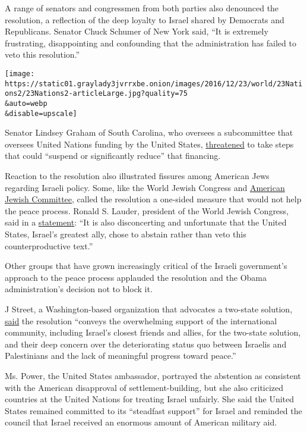 A range of senators and congressmen from both parties also denounced the
resolution, a reflection of the deep loyalty to Israel shared by
Democrats and Republicans. Senator Chuck Schumer of New York said, ``It
is extremely frustrating, disappointing and confounding that the
administration has failed to veto this resolution.''

\texttt{[image: https://static01.graylady3jvrrxbe.onion/images/2016/12/23/world/23Nations2/23Nations2-articleLarge.jpg?quality=75\\\&auto=webp\\\&disable=upscale]}

Senator Lindsey Graham of South Carolina, who oversees a subcommittee
that oversees United Nations funding by the United States,
\href{http://www.lgraham.senate.gov/public/index.cfm/press-releases?ID=3D8C552F-EE98-4A25-942E-5B389F2695F2}{threatened}
to take steps that could ``suspend or significantly reduce'' that
financing.

Reaction to the resolution also illustrated fissures among American Jews
regarding Israeli policy. Some, like the World Jewish Congress and
\href{http://www.ajc.org/site/apps/nlnet/content3.aspx?c=7oJILSPwFfJSG\&b=9302337\&ct=14976765\&notoc=1}{American
Jewish Committee}, called the resolution a one-sided measure that would
not help the peace process. Ronald S. Lauder, president of the World
Jewish Congress, said in a
\href{http://www.worldjewishcongress.org/en/news/wjc-president-lauder-dismayed-by-un-security-council-resolution-on-israeli-settlements-calls-us-choice-not-to-veto-disconcerting-an-unfortunate-12-5-2016}{statement}:
``It is also disconcerting and unfortunate that the United States,
Israel's greatest ally, chose to abstain rather than veto this
counterproductive text.''

Other groups that have grown increasingly critical of the Israeli
government's approach to the peace process applauded the resolution and
the Obama administration's decision not to block it.

J Street, a Washington-based organization that advocates a two-state
solution,
\href{http://jstreet.org/press-releases/j-street-welcomes-us-abstention-unsc-resolution/\#.WF2d7X35PZw}{said}
the resolution ``conveys the overwhelming support of the international
community, including Israel's closest friends and allies, for the
two-state solution, and their deep concern over the deteriorating status
quo between Israelis and Palestinians and the lack of meaningful
progress toward peace.''

Ms. Power, the United States ambassador, portrayed the abstention as
consistent with the American disapproval of settlement-building, but she
also criticized countries at the United Nations for treating Israel
unfairly. She said the United States remained committed to its
``steadfast support'' for Israel and reminded the council that Israel
received an enormous amount of American military aid.

